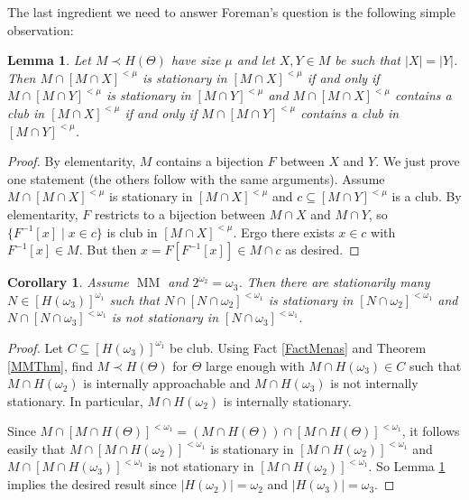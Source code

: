 \documentclass[a4paper]{amsart}
\theoremstyle{definition}
\theoremstyle{remark}
\theoremstyle{plain}
\newtheorem{mycol}[mydef]{Corollary}
\newtheorem{mylem}[mydef]{Lemma}
\numberwithin{mydef}{section}
\DeclareMathOperator{\MM}{MM}
\begin{document}
	The last ingredient we need to answer Foreman's question is the following simple observation:
	
	\begin{mylem}\label{LemmaMapping}
		Let $M\prec H(\Theta)$ have size $\mu$ and let $X,Y\in M$ be such that $|X|=|Y|$. Then $M\cap[M\cap X]^{<\mu}$ is stationary in $[M\cap X]^{<\mu}$ if and only if $M\cap[M\cap Y]^{<\mu}$ is stationary in $[M\cap Y]^{<\mu}$ and $M\cap[M\cap X]^{<\mu}$ contains a club in $[M\cap X]^{<\mu}$ if and only if $M\cap[M\cap Y]^{<\mu}$ contains a club in $[M\cap Y]^{<\mu}$.
	\end{mylem}
	
	\begin{proof}
		By elementarity, $M$ contains a bijection $F$ between $X$ and $Y$. We just prove one statement (the others follow with the same arguments). Assume $M\cap[M\cap X]^{<\mu}$ is stationary in $[M\cap X]^{<\mu}$ and $c\subseteq[M\cap Y]^{<\mu}$ is a club. By elementarity, $F$ restricts to a bijection between $M\cap X$ and $M\cap Y$, so $\{F^{-1}[x]\;|\;x\in c\}$ is club in $[M\cap X]^{<\mu}$. Ergo there exists $x\in c$ with $F^{-1}[x]\in M$. But then $x=F[F^{-1}[x]]\in M\cap c$ as desired.
	\end{proof}
	
	\begin{mycol}
		Assume $\MM$ and $2^{\omega_2}=\omega_3$. Then there are stationarily many $N\in[H(\omega_3)]^{\omega_1}$ such that $N\cap[N\cap\omega_2]^{<\omega_1}$ is stationary in $[N\cap\omega_2]^{<\omega_1}$ and $N\cap[N\cap\omega_3]^{<\omega_1}$ is not stationary in $[N\cap\omega_3]^{<\omega_1}$.
	\end{mycol}
	
	\begin{proof}
		Let $C\subseteq[H(\omega_3)]^{\omega_1}$ be club. Using Fact \ref{FactMenas} and Theorem \ref{MMThm}, find $M\prec H(\Theta)$ for $\Theta$ large enough with $M\cap H(\omega_3)\in C$ such that $M\cap H(\omega_2)$ is internally approachable and $M\cap H(\omega_3)$ is not internally stationary. In particular, $M\cap H(\omega_2)$ is internally stationary.
		
		Since $M\cap[M\cap H(\Theta)]^{<\omega_1}=(M\cap H(\Theta))\cap[M\cap H(\Theta)]^{<\omega_1}$, it follows easily that $M\cap[M\cap H(\omega_2)]^{<\omega_1}$ is stationary in $[M\cap H(\omega_2)]^{<\omega_1}$ and $M\cap[M\cap H(\omega_3)]^{<\omega_1}$ is not stationary in $[M\cap H(\omega_2)]^{<\omega_1}$. So Lemma \ref{LemmaMapping} implies the desired result since $|H(\omega_2)|=\omega_2$ and $|H(\omega_3)|=\omega_3$.
	\end{proof}
	
\end{document}
